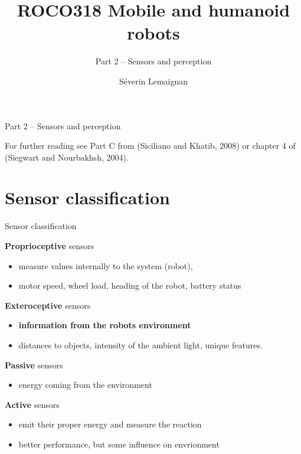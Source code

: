 \documentclass[compress]{beamer}
\title{ROCO318 \newline Mobile and humanoid robots}
\subtitle{Part 2 -- Sensors and perception}
\date{}
\author{Séverin Lemaignan}
\institute{Centre for Neural Systems and Robotics\\{\bf Plymouth University}}
\providecommand{\tightlist}{%
  \setlength{\itemsep}{0pt}\setlength{\parskip}{0pt}}
\begin{document}

\maketitle

\begin{frame}{Part 2 -- Sensors and perception}

For further reading see Part C from (Siciliano and Khatib, 2008) or
chapter 4 of (Siegwart and Nourbakhsh, 2004).

\end{frame}

\section{Sensor classification}\label{sensor-classification}

\begin{frame}{Sensor classification}

\textbf{Proprioceptive} sensors

\begin{itemize}
\tightlist
\item
  measure values internally to the system (robot),
\item
  \eg motor speed, wheel load, heading of the robot, battery status
\end{itemize}

\textbf{Exteroceptive} sensors

\begin{itemize}
\tightlist
\item
  \bf information from the robots environment
\item
  distances to objects, intensity of the ambient light, unique features.
\end{itemize}

\textbf{Passive} sensors

\begin{itemize}
\tightlist
\item
  energy coming from the environment
\end{itemize}

\textbf{Active} sensors

\begin{itemize}
\tightlist
\item
  emit their proper energy and measure the reaction
\item
  better performance, but some influence on envrionment
\end{itemize}

\end{frame}
\end{document}
